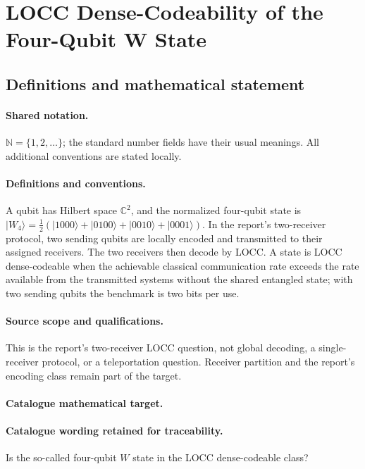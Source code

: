 \documentclass[11pt]{article}
\begin{document}
\section{LOCC Dense-Codeability of the Four-Qubit W State}\label{statement}

\subsection{Definitions and mathematical statement}

\paragraph{Shared notation.}$\mathbb N=\{1,2,\ldots\}$; the standard number fields have their usual meanings. All additional conventions are stated locally.


\paragraph{Definitions and conventions.} A qubit has Hilbert space $\mathbb C^2$, and the normalized four-qubit state is $|W_4\rangle=\tfrac12(|1000\rangle+|0100\rangle+|0010\rangle+|0001\rangle)$. In the report's two-receiver protocol, two sending qubits are locally encoded and transmitted to their assigned receivers. The two receivers then decode by LOCC. A state is LOCC dense-codeable when the achievable classical communication rate exceeds the rate available from the transmitted systems without the shared entangled state; with two sending qubits the benchmark is two bits per use.

\paragraph{Source scope and qualifications.} This is the report's two-receiver LOCC question, not global decoding, a single-receiver protocol, or a teleportation question. Receiver partition and the report's encoding class remain part of the target.

\paragraph{Catalogue mathematical target.}
\paragraph{Catalogue wording retained for traceability.}
Is the so-called four-qubit $W$ state in the LOCC dense-codeable class?
\end{document}
